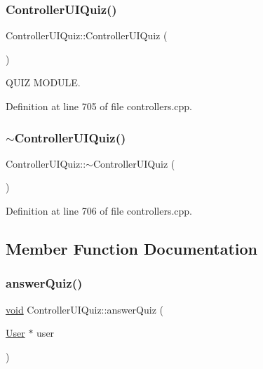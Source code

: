 \subsubsection{\texorpdfstring{Controller\+U\+I\+Quiz()}{ControllerUIQuiz()}}
{\footnotesize\ttfamily Controller\+U\+I\+Quiz\+::\+Controller\+U\+I\+Quiz (\begin{DoxyParamCaption}{ }\end{DoxyParamCaption})}



Q\+U\+IZ M\+O\+D\+U\+LE. 



Definition at line 705 of file controllers.\+cpp.

\mbox{\label{class_controller_u_i_quiz_a9658d952317cfa8da8d307e363877c09}} 
\subsubsection{\texorpdfstring{$\sim$\+Controller\+U\+I\+Quiz()}{~ControllerUIQuiz()}}
{\footnotesize\ttfamily Controller\+U\+I\+Quiz\+::$\sim$\+Controller\+U\+I\+Quiz (\begin{DoxyParamCaption}{ }\end{DoxyParamCaption})}



Definition at line 706 of file controllers.\+cpp.



\subsection{Member Function Documentation}
\mbox{\label{class_controller_u_i_quiz_a284e57b6ddb5546f737e4be6b5bbee24}} 
\subsubsection{\texorpdfstring{answer\+Quiz()}{answerQuiz()}}
{\footnotesize\ttfamily \hyperlink{class_interface_u_i_quiz_a8a3301246ca34b00553527afef00eb23}{void} Controller\+U\+I\+Quiz\+::answer\+Quiz (\begin{DoxyParamCaption}\item[{\hyperlink{class_user}{User} $\ast$}]{user }\end{DoxyParamCaption})}

